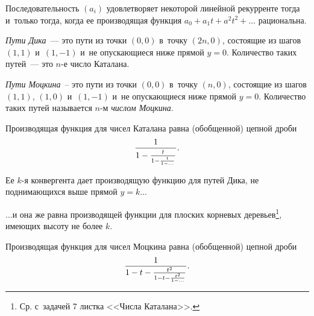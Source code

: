 \documentclass[a4paper, 12pt]{article}
\begin{document}
Последовательность $(a_i)$ удовлетворяет некоторой линейной рекурренте
тогда и~только тогда, когда
ее производящая функция $a_0+a_1t+a^2t^2+\ldots$ рациональна.





\emph{Пути Дика}~--- это пути из точки $(0,0)$ в~точку $(2n,0)$, состоящие из шагов $(1,1)$ и~$(1,-1)$ и~не опускающиеся ниже прямой $y=0$. Количество таких путей~--- это $n$-е число Каталана.

\emph{Пути Моцкина}~-- это пути из точки $(0,0)$ в~точку $(n,0)$, состоящие из шагов $(1,1)$, $(1,0)$ и~$(1,-1)$ и~не опускающиеся ниже прямой $y=0$. Количество таких путей называется $n$-м \emph{числом Моцкина}.




%
 Производящая функция для чисел Каталана равна (обобщенной) цепной дроби
\[
\abovedisplayshortskip=-5pt
\frac1{1-\frac{\mathstrut t}{1-\frac{\mathstrut t}{1-\ldots}}}.
\]

 Ее $k$-я конвергента дает производящую функцию для путей Дика, не поднимающихся выше прямой $y=k$...

 ...и она же равна производящей функции для плоских корневых деревьев\footnote{Ср. с~задачей 7 листка <<Числа Каталана>>.}, имеющих высоту не более $k$.






 Производящая функция для чисел Моцкина равна (обобщенной) цепной дроби
\[
\abovedisplayshortskip=-5pt
\frac1{1-t-\frac{t^2}{1-t-\frac{t^2}{1-\ldots}}}.
\]
\end{document}
